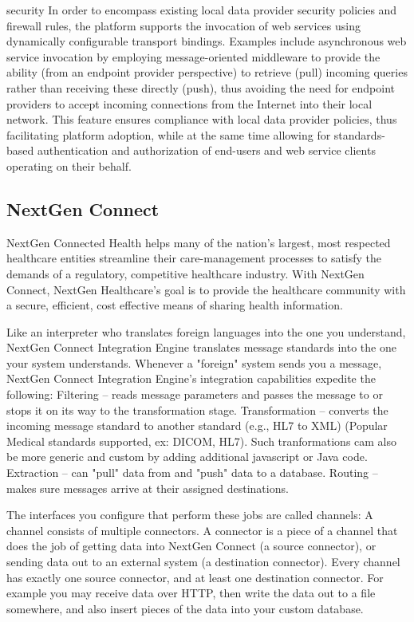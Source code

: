 security
In order to encompass existing local data provider security policies and firewall rules, the platform supports the invocation of web services using dynamically configurable transport bindings.
Examples include asynchronous web service invocation by employing message-oriented middleware to provide the ability (from an endpoint provider perspective) to retrieve (pull) incoming queries rather than receiving these directly (push), thus avoiding the need for endpoint providers to accept incoming connections from the Internet into their local network.
This feature ensures compliance with local data provider policies, thus facilitating platform adoption, while at the same time allowing for standards-based authentication and authorization of end-users and web service clients operating on their behalf.

\subsection*{NextGen Connect}
NextGen Connected Health helps many of the nation’s largest, most respected healthcare entities streamline their
care-management processes to satisfy the demands of a regulatory, competitive healthcare industry.
With NextGen Connect, NextGen Healthcare's goal is to provide the healthcare community with a secure, efficient, cost effective means of sharing health information.

Like an interpreter who translates foreign languages into the one you understand, NextGen Connect Integration Engine translates message standards into the one your system understands.
Whenever a "foreign" system sends you a message, NextGen Connect Integration Engine’s integration capabilities expedite the following:
Filtering – reads message parameters and passes the message to or stops it on its way to the transformation stage.
Transformation – converts the incoming message standard to another standard (e.g., HL7 to XML) (Popular Medical standards supported, ex: DICOM, HL7). Such tranformations cam also be more generic and custom by adding additional javascript or Java code.
Extraction – can "pull" data from and "push" data to a database.
Routing – makes sure messages arrive at their assigned destinations.

The interfaces you configure that perform these jobs are called channels:
A channel consists of multiple connectors.
A connector is a piece of a channel that does the job of getting data into NextGen Connect (a source connector), or sending data out to an external system (a destination connector).
Every channel has exactly one source connector, and at least one destination connector.
For example you may receive data over HTTP, then write the data out to a file somewhere, and also insert pieces of the data into your custom database.

